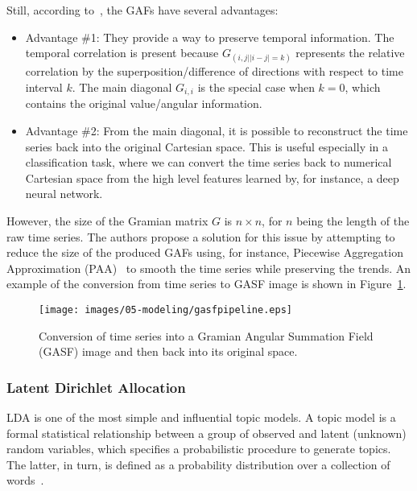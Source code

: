 Still, according to~\cite{wang_imaging_2015}, the GAFs have several advantages:

\begin{itemize}[leftmargin=*,labelsep=5.8mm]
\item {Advantage \#1}: They provide a way to preserve temporal information. The temporal correlation is present because $G_{(i,j||i-j|=k)}$ represents the relative correlation by the superposition/difference of directions with respect to time interval $k$. The main diagonal $G_{i,i}$ is the special case when $k = 0$, which contains the original value/angular information. 
\item {Advantage \#2:} From the main diagonal, it is possible to reconstruct the time series back into the original Cartesian space. This is useful especially in a classification task, where we can convert the time series back to numerical Cartesian space from the high level features learned by, for instance, a deep neural network.
\end{itemize}

However, the size of the Gramian matrix $G$ is $n \times n$, for $n$ being the length of the raw time series. The authors propose a solution for this issue by attempting to reduce the size of the produced GAFs using, for instance, Piecewise Aggregation Approximation (PAA)~\cite{keogh_scaling_2000} to smooth the time series while preserving the trends. An example of the conversion from time series to GASF image is shown in Figure~\ref{figure:gasf_example}.

\begin{figure} [H]
\centering
\texttt{[image: images/05-modeling/gasfpipeline.eps]} 
 \caption{Conversion of time series into a Gramian Angular Summation Field (GASF) image and then back into its original space.}
 \label{figure:gasf_example}
\end{figure}

\subsubsection{Latent Dirichlet Allocation}
LDA is one of the most simple and influential topic models. {A topic model is a formal statistical relationship between a group of observed and latent (unknown) random variables, which specifies a probabilistic procedure to generate topics. The latter, in turn, is defined as a probability distribution over a collection of words}~\cite{reed_latent_2012}.

